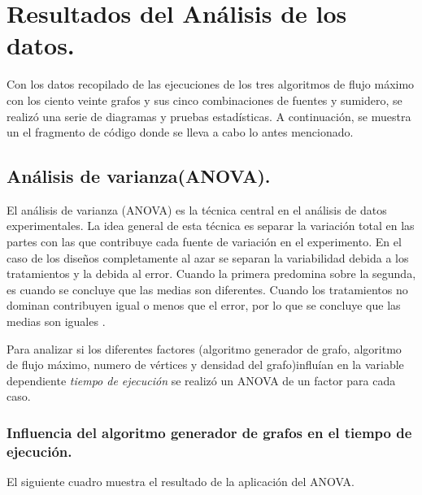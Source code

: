 \documentclass{article}
\begin{document}
\section{Resultados del Análisis de los datos.}

Con los datos recopilado de las ejecuciones de los tres algoritmos de flujo máximo con los ciento veinte grafos y sus cinco combinaciones de fuentes y sumidero, se realizó una serie de diagramas y pruebas estadísticas. A continuación, se muestra un el fragmento de código donde se lleva a cabo lo antes mencionado.

 
\begin{center}

\end{center}
\subsection{Análisis de varianza(ANOVA).}
El análisis de varianza (ANOVA) es la técnica central en el análisis de datos experimentales. La idea general de esta técnica es separar la variación total en las partes con las que contribuye cada fuente de variación en el experimento. En el caso de los diseños completamente al azar se separan la variabilidad debida a los tratamientos y la debida al error. Cuando la primera predomina sobre la segunda, es cuando se concluye que las medias son diferentes. Cuando los tratamientos no dominan contribuyen igual o menos que el error, por lo que se concluye que las medias son iguales \cite{ade}.

Para analizar si los diferentes factores (algoritmo generador de grafo, algoritmo de flujo máximo, numero de vértices y densidad del grafo)influían en la variable dependiente \textit{tiempo de ejecución} se realizó un ANOVA de un factor para cada caso. 

\subsubsection{Influencia del algoritmo generador de grafos en el tiempo de ejecución.}
El siguiente cuadro muestra el resultado de la aplicación del ANOVA.
\end{document}
